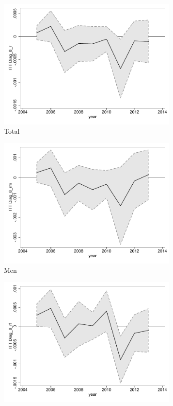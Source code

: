 \documentclass[a4paper ]{article}
\begin{document}
\begin{figure}[h!]
	\centering
	\begin{subfigure}[t]{0.31\textwidth}
		\centering
		\includegraphics[width=0.99\textwidth]{R1_LC_Diag_8_r}
		\caption{Total}		
	\end{subfigure}
	\begin{subfigure}[t]{0.31\textwidth}
		\centering
		\includegraphics[width=0.99\textwidth]{R1_LC_Diag_8_rm}
		\caption{Men}		
	\end{subfigure}
	\quad
	\begin{subfigure}[t]{0.31\textwidth}
		\centering
		\includegraphics[width=0.99\textwidth]{R1_LC_Diag_8_rf}

\end{subfigure}
\end{figure}
\end{document}
